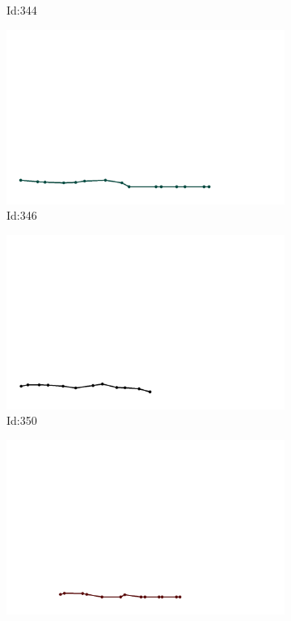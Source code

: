 \documentclass[12pt,twoside]{report}
\begin{document}
\begin{figure}
\begin{subfigure}[b]{0.20\textwidth}
\caption{Id:344}
\end{subfigure}
\begin{subfigure}[b]{0.20\textwidth}
\centering
\includegraphics[width=\textwidth]{../trajectories/346.png}
\caption{Id:346}
\end{subfigure}
\begin{subfigure}[b]{0.20\textwidth}
\centering
\includegraphics[width=\textwidth]{../trajectories/350.png}
\caption{Id:350}
\end{subfigure}
\begin{subfigure}[b]{0.20\textwidth}
\centering
\includegraphics[width=\textwidth]{../trajectories/355.png}

\end{subfigure}
\end{figure}
\end{document}
